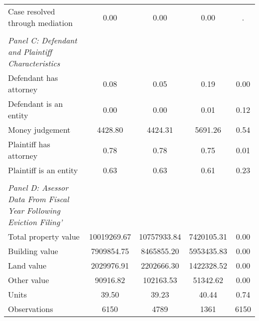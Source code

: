 {\begin{tabular}{l*{4}{c}}
\hspace{0.25cm}Case resolved through mediation&       0.00 &       0.00 &       0.00 &           .\\
\vspace{0.1em} \\ \emph{Panel C: Defendant and Plaintiff Characteristics}&            &            &            &            \\
\hspace{0.25cm}Defendant has attorney&       0.08 &       0.05 &       0.19 &        0.00\\
\hspace{0.25cm}Defendant is an entity&       0.00 &       0.00 &       0.01 &        0.12\\
\hspace{0.25cm}Money judgement&    4428.80 &    4424.31 &    5691.26 &        0.54\\
\hspace{0.25cm}Plaintiff has attorney&       0.78 &       0.78 &       0.75 &        0.01\\
\hspace{0.25cm}Plaintiff is an entity&       0.63 &       0.63 &       0.61 &        0.23\\
\vspace{0.1em} \\ \emph{Panel D: Asessor Data From Fiscal Year Following Eviction Filing'}&            &            &            &            \\
\hspace{0.25cm}Total property value&10019269.67 &10757933.84 & 7420105.31 &        0.00\\
\hspace{0.25cm}Building value& 7909854.75 & 8465855.20 & 5953435.83 &        0.00\\
\hspace{0.25cm}Land value& 2029976.91 & 2202666.30 & 1422328.52 &        0.00\\
\hspace{0.25cm}Other value&   90916.82 &  102163.53 &   51342.62 &        0.00\\
\hspace{0.25cm}Units&      39.50 &      39.23 &      40.44 &        0.74\\
\midrule
Observations        &        6150&        4789&        1361&        6150\\
\bottomrule
\end{tabular}
}
